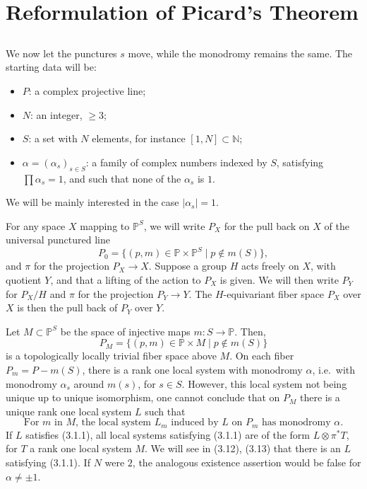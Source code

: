 \documentclass[12pt,a4paper]{article}
\theoremstyle{plain}
\theoremstyle{definition}
\theoremstyle{remark}
\newcommand{\NN}{\mathbb{N}}
\newcommand{\PP}{\mathbb{P}}
\numberwithin{equation}{section}
\providecommand{\NN}{\mathbb{N}}
\providecommand{\PP}{\mathbb{P}}
\begin{document}
\section{Reformulation of Picard's Theorem}

\subsection{}
We now let the punctures $s$ move, while the monodromy remains the same. The starting data will be:
\begin{itemize}
\item[$\bullet$] $P$: a complex projective line;
\item[$\bullet$] $N$: an integer, $\geq 3$;
\item[$\bullet$] $S$: a set with $N$ elements, for instance $[1, N] \subset \NN$;
\item[$\bullet$] $\alpha = (\alpha_s)_{s \in S}$: a family of complex numbers indexed by $S$, satisfying $\prod \alpha_s = 1$, and such that none of the $\alpha_s$ is $1$.
\end{itemize}
We will be mainly interested in the case $|\alpha_s| = 1$.

For any space $X$ mapping to $\PP^S$, we will write $P_X$ for the pull back on $X$ of the universal punctured line
\[
P_0 = \{(p, m) \in \PP \times \PP^S \mid p \notin m(S)\},
\]
and $\pi$ for the projection $P_X \to X$. Suppose a group $H$ acts freely on $X$, with quotient $Y$, and that a lifting of the action to $P_X$ is given. We will then write $P_Y$ for $P_X/H$ and $\pi$ for the projection $P_Y \to Y$. The $H$-equivariant fiber space $P_X$ over $X$ is then the pull back of $P_Y$ over $Y$.

Let $M \subset \PP^S$ be the space of injective maps $m: S \to \PP$. Then,
\[
P_M = \{(p, m) \in \PP \times M \mid p \notin m(S)\}
\]
is a topologically locally trivial fiber space above $M$. On each fiber $P_m = P - m(S)$, there is a rank one local system with monodromy $\alpha$, i.e.\ with monodromy $\alpha_s$ around $m(s)$, for $s \in S$. However, this local system not being unique up to unique isomorphism, one cannot conclude that on $P_M$ there is a unique rank one local system $L$ such that
\begin{equation}\label{eq:3.1.1}
\text{For $m$ in $M$, the local system $L_m$ induced by $L$ on $P_m$ has monodromy $\alpha$.}
\end{equation}
If $L$ satisfies (3.1.1), all local systems satisfying (3.1.1) are of the form $L \otimes \pi^*T$, for $T$ a rank one local system $M$. We will see in (3.12), (3.13) that there is an $L$ satisfying (3.1.1). If $N$ were $2$, the analogous existence assertion would be false for $\alpha \neq \pm 1$.
\end{document}
